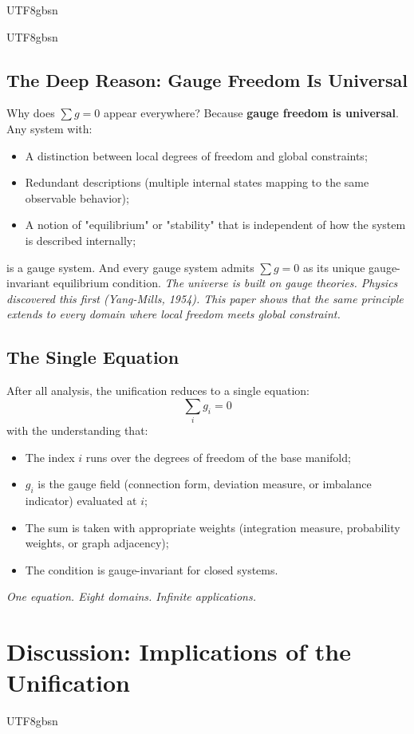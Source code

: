 \documentclass[11pt,a4paper]{article}
\begin{document}
\begin{CJK}{UTF8}{gbsn}
{\begin{CJK}{UTF8}{gbsn}
\subsection{The Deep Reason: Gauge Freedom Is Universal}
Why does $\sum g = 0$ appear everywhere? Because \textbf{gauge freedom is universal}.
Any system with:
\begin{itemize}
    \item A distinction between local degrees of freedom and global constraints;
    \item Redundant descriptions (multiple internal states mapping to the same
          observable behavior);
    \item A notion of "equilibrium" or "stability" that is independent of
          how the system is described internally;
\end{itemize}
is a gauge system. And every gauge system admits $\sum g = 0$ as its unique
gauge-invariant equilibrium condition.
\textit{The universe is built on gauge theories. Physics discovered this first
(Yang-Mills, 1954). This paper shows that the same principle extends to every
domain where local freedom meets global constraint.}
\subsection{The Single Equation}
After all analysis, the unification reduces to a single equation:
\begin{equation}
    \boxed{\displaystyle\sum_{i} g_i = 0}
\end{equation}
with the understanding that:
\begin{itemize}
    \item The index $i$ runs over the degrees of freedom of the base manifold;
    \item $g_i$ is the gauge field (connection form, deviation measure, or
          imbalance indicator) evaluated at $i$;
    \item The sum is taken with appropriate weights (integration measure,
          probability weights, or graph adjacency);
    \item The condition is gauge-invariant for closed systems.
\end{itemize}
\textit{One equation. Eight domains. Infinite applications.}
\end{CJK}
\section{Discussion: Implications of the Unification}
\label{sec:discussion}
\begin{CJK}{UTF8}{gbsn}

\end{CJK}}
\end{CJK}
\end{document}
